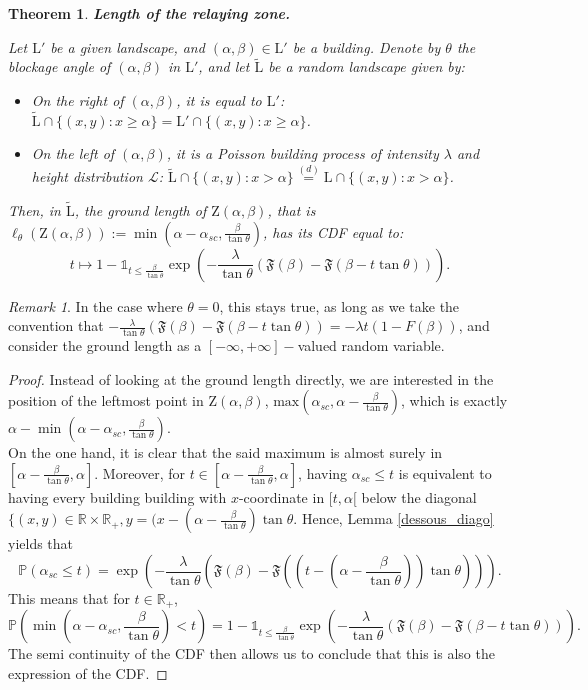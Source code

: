 \documentclass[10pt,english,a4paper]{smfart}
\newtheorem{theorem}{Theorem}[section]
\theoremstyle{definition}
\theoremstyle{remark}
\newtheorem{remark}{Remark}
\newcommand{\R}{\mathbb{R}}
\newcommand{\landsc}{\mathrm{L}}
\newcommand{\Half}{\R \times \R_+}
\newcommand{\primi}{\mathfrak{F}}
\newcommand{\zone}{\mathrm{Z}}
\newcommand{\p}{\mathbb{P}}
\renewcommand{\max}{\text{max}}
\begin{document}
\begin{theorem}\textbf{Length of the relaying zone.}\label{length}

Let $\landsc '$ be a given landscape, and $(\alpha, \beta)\in \landsc'$ be a building. Denote by $\theta$ the blockage angle of $(\alpha, \beta)$ in $\landsc'$, and let $\tilde{\landsc}$ be a random landscape given by:
\begin{itemize}
    \item On the right of $(\alpha, \beta)$, it is equal to $\landsc'$: $\tilde{\landsc}\cap \{(x, y): x\geq \alpha\} = \landsc' \cap \{(x, y): x\geq \alpha\}$.
    \item On the left of $(\alpha, \beta)$, it is a Poisson building process of intensity $\lambda$ and height distribution $\mathcal{L}$: $\tilde{\landsc}\cap \{(x, y): x> \alpha\} \overset{(d)}{=}\landsc \cap \{(x, y): x> \alpha\}$.
\end{itemize}
Then, in $\tilde{\landsc}$, the ground length of $\zone(\alpha, \beta)$, that is $\ell_\theta(\zone(\alpha, \beta)) := \min(\alpha-\alpha_{sc}, \frac{\beta}{\tan\theta})$, has its CDF equal to:
\[t\mapsto 1- \mathds{1}_{t\leq \frac{\beta}{\tan\theta}}\exp\left(-\frac{\lambda}{\tan\theta}(\primi(\beta)-\primi(\beta-t\tan\theta))\right).\]
\end{theorem}

\begin{remark}
In the case where $\theta = 0$, this stays true, as long as we take the convention that $-\frac{\lambda}{\tan\theta}(\primi(\beta)-\primi(\beta-t\tan\theta)) = -\lambda t (1-F(\beta))$, and consider the ground length as a $[-\infty, +\infty]-$valued random variable.
\end{remark}

\begin{proof}
Instead of looking at the ground length directly, we are interested in the position of the leftmost point in $\zone(\alpha, \beta)$, $\max(\alpha_{sc},\alpha-\frac{\beta}{\tan\theta})$, which is exactly $\alpha- \min(\alpha-\alpha_{sc}, \frac{\beta}{\tan\theta})$.\\
On the one hand, it is clear that the said maximum is almost surely in $[\alpha-\frac{\beta}{\tan\theta}, \alpha]$. Moreover, for $t\in [\alpha-\frac{\beta}{\tan\theta}, \alpha]$, having $\alpha_{sc} \leq t$ is equivalent to having every building building with $x$-coordinate in $[t, \alpha[$ below the diagonal $\{(x, y)\in \Half, y = (x-(\alpha-\frac{\beta}{\tan \theta})\tan \theta$. Hence, Lemma \ref{dessous_diago} yields that
\[\p(\alpha_{sc} \leq t) = \exp\left(-\frac{\lambda}{\tan \theta}(\primi(\beta)-\primi((t-(\alpha-\frac{\beta}{\tan \theta}))\tan\theta))\right).\]
This means that for $t\in \R_+$, 
\[\p(\min(\alpha-\alpha_{sc}, \frac{\beta}{\tan\theta})<t) = 1- \mathds{1}_{t\leq \frac{\beta}{\tan\theta}}\exp\left(-\frac{\lambda}{\tan\theta}(\primi(\beta)-\primi(\beta-t\tan\theta))\right).\]
The semi continuity of the CDF then allows us to conclude that this is also the expression of the CDF.
\end{proof} 
\end{document}
